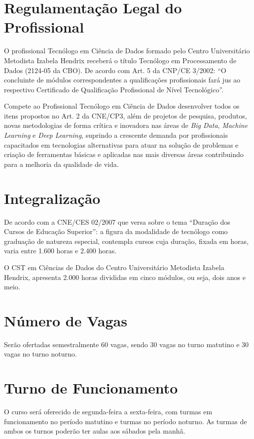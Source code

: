 \documentclass[a4paper, 12pt, openright, oneside, german, french, english, brazil]{abntex2}
\begin{document}
\section{Regulamentação Legal do Profissional}

O profissional Tecnólogo em Ciência de Dados formado pelo Centro Universitário Metodista Izabela Hendrix receberá o título Tecnólogo em Processamento de Dados (2124-05 da CBO). De acordo com Art. 5 da CNP/CE 3/2002: ``O concluinte de módulos correspondentes a qualificações profissionais fará jus ao respectivo Certificado de Qualificação Profissional de Nível Tecnológico''.

Compete ao Profissional Tecnólogo em Ciência de Dados desenvolver todos os itens propostos no Art. 2 da CNE/CP3, além de projetos de pesquisa, produtos, novas metodologias de forma crítica e inovadora nas áreas de \textit{Big Data}, \textit{Machine Learning} e \textit{Deep Learning}, suprindo a crescente demanda por profissionais capacitados em tecnologias alternativas para atuar na solução de problemas e criação de ferramentas básicas e aplicadas nas mais diversas áreas contribuindo para a melhoria da qualidade de vida.

\section{Integralização}

De acordo com a CNE/CES 02/2007 que versa sobre o tema ``Duração dos Cursos de Educação Superior'': a figura da modalidade de tecnólogo como graduação de natureza especial, contempla cursos cuja duração, fixada em horas, varia entre 1.600 horas e 2.400 horas.

O CST em Ciências de Dados do Centro Universitário Metodista Izabela Hendrix, apresenta 2.000 horas divididas em cinco módulos, ou seja, dois anos e meio.

\section{Número de Vagas}
Serão ofertadas semestralmente 60 vagas, sendo 30 vagas no turno matutino e 30 vagas no turno noturno.

\section{Turno de Funcionamento}
O curso será oferecido de segunda-feira a sexta-feira, com turmas em funcionamento no período matutino e turmas no período noturno. As turmas de ambos os turnos poderão ter aulas aos sábados pela manhã.
\end{document}
